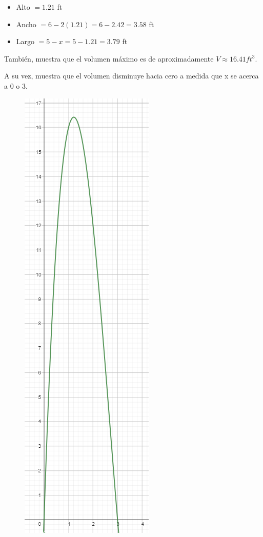 \documentclass[12pt]{article}
\begin{document}
\begin{enumerate}[label=\alph*)]
\begin{itemize}
	\item Alto $=1.21$ ft
	\item Ancho $=6-2(1.21)=6-2.42=3.58$ ft
	\item Largo $=5-x=5-1.21=3.79$ ft
\end{itemize}

También, muestra que el volumen máximo es de aproximadamente $V \approx 16.41 ft^3$. 

A su vez, muestra que el volumen disminuye hacia cero a medida que x se acerca a 0 o 3.

\begin{figure}[h]
	\centering
	\includegraphics[height=0.6\textheight]{img/p7_vmax.png}
\end{figure}

\end{enumerate}
\end{document}

